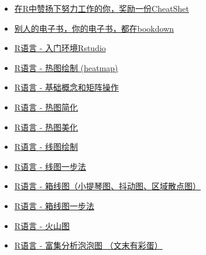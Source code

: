 \documentclass[]{article}
\providecommand{\tightlist}{%
  \setlength{\itemsep}{0pt}\setlength{\parskip}{0pt}}
\numberwithin{figure}{section}
\numberwithin{table}{section}
\begin{document}
\begin{itemize}
\tightlist
\item
  \href{http://mp.weixin.qq.com/s/x3tWrQPriLRFXO8ZaD93EQ}{在R中赞扬下努力工作的你，奖励一份CheatShet}
\item
  \href{http://mp.weixin.qq.com/s/u8WfC4xQ562Uekhs4WVBoQ}{别人的电子书，你的电子书，都在bookdown}
\item
  \href{http://mp.weixin.qq.com/s?__biz=MzI5MTcwNjA4NQ==\&mid=2247483882\&idx=1\&sn=e16903b4b745a1ef51855be3824149f6\&chksm=ec0dc460db7a4d76a70bd4ca2d250f147225252ee963d3e577affaebeeb81dea1ff639d5e9aa\#rd}{R语言 - 入门环境Rstudio}
\item
  \href{http://mp.weixin.qq.com/s/mNSkf1rjWTCtE1pIOuI2rA}{R语言 - 热图绘制 (heatmap)}
\item
  \href{http://mp.weixin.qq.com/s?__biz=MzI5MTcwNjA4NQ==\&mid=2247483891\&idx=1\&sn=40daf6435398c4d9a41f332e9bba4915\&chksm=ec0dc479db7a4d6fec413bfb90a4660eb035b440d2bbee998114f7af29e3b3338a8adf62540a\#rd}{R语言 - 基础概念和矩阵操作}
\item
  \href{https://mp.weixin.qq.com/s/_9LKs6t6rcjzokF_0gneSA}{R语言 - 热图简化}
\item
  \href{http://mp.weixin.qq.com/s/lKrhvYrwn93esC6MA3bHWw}{R语言 - 热图美化}
\item
  \href{http://mp.weixin.qq.com/s/YB-9tE4ut9RN0yfS8qBhtQ}{R语言 - 线图绘制}
\item
  \href{http://mp.weixin.qq.com/s?__biz=MzI5MTcwNjA4NQ==\&mid=2247483947\&idx=1\&sn=7cf0252efff5433447507b977fcaff97\&chksm=ec0dc7a1db7a4eb77a269709bdf2c8ab51bcad89aa780ec0be171a333e1cb8f3cc27eff277a1\#rd}{R语言 - 线图一步法}
\item
  \href{http://mp.weixin.qq.com/s?__biz=MzI5MTcwNjA4NQ==\&mid=2247483964\&idx=1\&sn=ee52ac37fb9a919f5c75c0abe2a49ad4\&chksm=ec0dc7b6db7a4ea0a51306347fc43265c41fda3eeaf4764ddc3795546371327579676cd74a38\#rd}{R语言 - 箱线图（小提琴图、抖动图、区域散点图）}
\item
  \href{http://mp.weixin.qq.com/s?__biz=MzI5MTcwNjA4NQ==\&mid=2247483971\&idx=1\&sn=1b40a1137ccb8b2fa1ab3eb1d0f05de9\&chksm=ec0dc7c9db7a4edf16ea4966b9acb7f23cd23bd6a2e59450ae11bdac899fa2fceb124264dcf4\#rd}{R语言 - 箱线图一步法}
\item
  \href{http://mp.weixin.qq.com/s?__biz=MzI5MTcwNjA4NQ==\&mid=2247483996\&idx=1\&sn=9a29d52e78e9acffeb0a78077a14f9f2\&chksm=ec0dc7d6db7a4ec0163259e81e4ded54875a5dd8adaafbc6975a86c71223d863627ba37801e5\#rd}{R语言 - 火山图}
\item
  \href{http://mp.weixin.qq.com/s?__biz=MzI5MTcwNjA4NQ==\&mid=2247483978\&idx=1\&sn=e0c158c0e92375553036cc37f4987e40\&chksm=ec0dc7c0db7a4ed6ac593493b7d8b52f11f2feb92d24fa00d19527fbb6f95b24f7e313ef9440\#rd}{R语言 - 富集分析泡泡图 （文末有彩蛋）}

\end{itemize}
\end{document}
